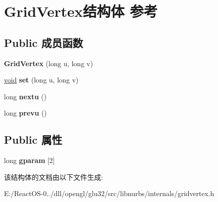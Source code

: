 \hypertarget{struct_grid_vertex}{}\section{Grid\+Vertex结构体 参考}
\label{struct_grid_vertex}
\subsection*{Public 成员函数}
\begin{DoxyCompactItemize}
\item 
\mbox{\label{struct_grid_vertex_aa34ed03aa0ff957f906eebb738d8d1b4}} 
{\bfseries Grid\+Vertex} (long u, long v)
\item 
\mbox{\label{struct_grid_vertex_aca5a894195f9b7ce3047fb7ef1a564b1}} 
\hyperlink{interfacevoid}{void} {\bfseries set} (long u, long v)
\item 
\mbox{\label{struct_grid_vertex_a2271545b875d8c0b20709b0165614efd}} 
long {\bfseries nextu} ()
\item 
\mbox{\label{struct_grid_vertex_ad50925bf19bdd3bfef20d4ec783ca895}} 
long {\bfseries prevu} ()
\end{DoxyCompactItemize}
\subsection*{Public 属性}
\begin{DoxyCompactItemize}
\item 
\mbox{\label{struct_grid_vertex_ad0f7f2eaa18b000abe3eefccbc039ed2}} 
long {\bfseries gparam} \mbox{[}2\mbox{]}
\end{DoxyCompactItemize}


该结构体的文档由以下文件生成\+:\begin{DoxyCompactItemize}
\item 
E\+:/\+React\+O\+S-\/0../dll/opengl/glu32/src/libnurbs/internals/gridvertex.\+h\end{DoxyCompactItemize}
